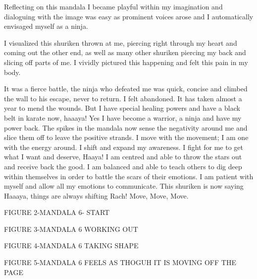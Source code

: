 Reflecting on this mandala I became playful within my imagination and dialoguing with the image was easy as prominent voices arose and I automatically envisaged myself as a ninja. 

I visualized this shuriken thrown at me, piercing right through my heart and coming out the other end, as well as many other shuriken piercing my back and slicing off parts of me. I vividly pictured this happening and felt this pain in my body. 

It was a fierce battle, the ninja who defeated me was quick, concise and climbed the wall to his escape, never to return. I felt abandoned. It has taken almost a year to mend the wounds. But I have special healing powers and have a black belt in karate now, haaaya! Yes I have become a warrior, a ninja and have my power back. The spikes in the mandala now sense the negativity around me and slice them off to leave the positive strands. I move with the movement; I am one with the energy around. I shift and expand my awareness. I fight for me to get what I want and deserve, Haaya! I am centred and able to throw the stars out and receive back the good. I am balanced and able to teach others to dig deep within themselves in order to battle the scars of their emotions. I am patient with myself and allow all my emotions to communicate. This shuriken is now saying Haaaya, things are always shifting Rach! Move, Move, Move. 


FIGURE 2-MANDALA 6- START

FIGURE 3-MANDALA 6 WORKING OUT

FIGURE 4-MANDALA 6 TAKING SHAPE

FIGURE 5-MANDALA 6 FEELS AS THOGUH IT IS MOVING OFF THE PAGE













